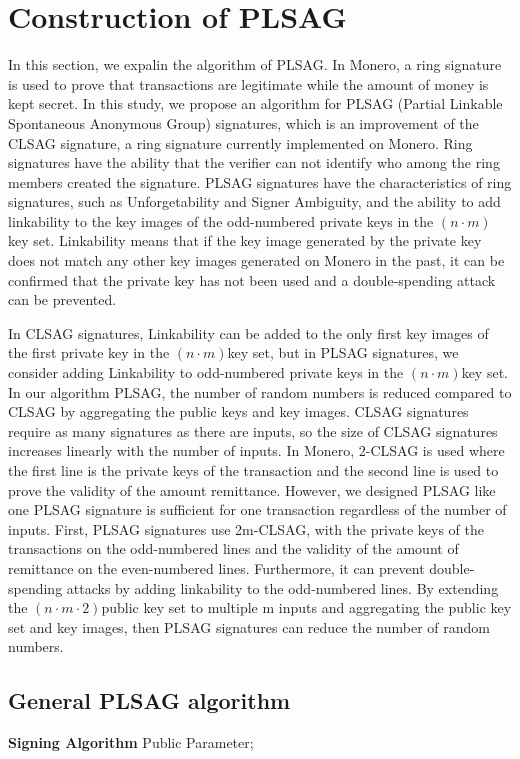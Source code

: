 \section{Construction of PLSAG}
    In this section, we expalin the algorithm of PLSAG.
    In Monero, a ring signature is used to prove that transactions are legitimate while the amount of money is kept secret. In this study, we propose an algorithm for PLSAG (Partial Linkable Spontaneous Anonymous Group) signatures, which is an improvement of the CLSAG signature, a ring signature currently implemented on Monero. Ring signatures have the ability that the verifier can not identify who among the ring members created the signature. PLSAG signatures have the characteristics of ring signatures, such as Unforgetability and Signer Ambiguity, and the ability to add linkability to the key images of the odd-numbered private keys in the $(n\cdot m)$key set. Linkability means that if the key image generated by the private key does not match any other key images generated on Monero in the past, it can be confirmed that the private key has not been used and a double-spending attack can be prevented.
    
    In CLSAG signatures, Linkability can be added to the only first key images of the first private key in the $(n\cdot m)$key set, but in PLSAG signatures, we consider adding Linkability to odd-numbered private keys in the $(n\cdot m)$key set. In our algorithm PLSAG, the number of random numbers is reduced compared to CLSAG by aggregating the public keys and key images. CLSAG signatures require as many signatures as there are inputs, so the size of CLSAG signatures increases linearly with the number of inputs. In Monero, 2-CLSAG is used where the first line is the private keys of the transaction and the second line is used to prove the validity of the amount remittance. However, we designed PLSAG like one PLSAG signature is sufficient for one transaction regardless of the number of inputs. First, PLSAG signatures use 2m-CLSAG, with the private keys of the transactions on the odd-numbered lines and the validity of the amount of remittance on the even-numbered lines. Furthermore, it can prevent double-spending attacks by adding linkability to the odd-numbered lines. By extending the $(n\cdot m \cdot 2)$public key set to multiple m inputs and aggregating the public key set and key images, then PLSAG signatures can reduce the number of random numbers.
    
\subsection{General PLSAG algorithm}
    \textbf{Signing Algorithm}
    Public Parameter;
    
